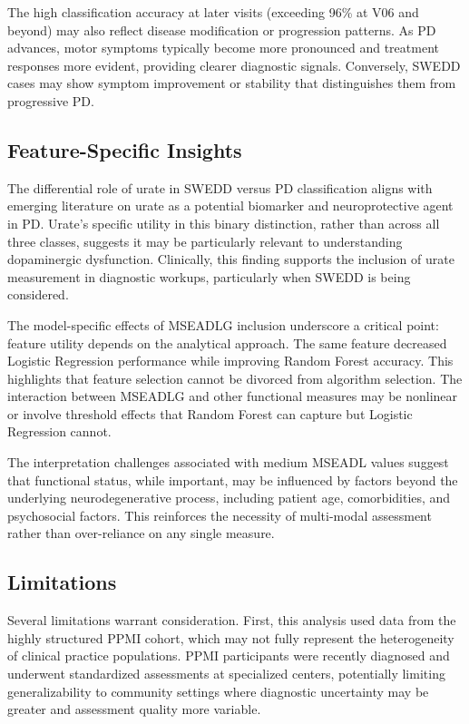\documentclass[12pt,a4paper]{article}
\begin{document}
The high classification accuracy at later visits (exceeding 96\% at V06 and beyond) may also reflect disease modification or progression patterns. As PD advances, motor symptoms typically become more pronounced and treatment responses more evident, providing clearer diagnostic signals. Conversely, SWEDD cases may show symptom improvement or stability that distinguishes them from progressive PD.

\subsection*{Feature-Specific Insights}

The differential role of urate in SWEDD versus PD classification aligns with emerging literature on urate as a potential biomarker and neuroprotective agent in PD. Urate's specific utility in this binary distinction, rather than across all three classes, suggests it may be particularly relevant to understanding dopaminergic dysfunction. Clinically, this finding supports the inclusion of urate measurement in diagnostic workups, particularly when SWEDD is being considered.

The model-specific effects of MSEADLG inclusion underscore a critical point: feature utility depends on the analytical approach. The same feature decreased Logistic Regression performance while improving Random Forest accuracy. This highlights that feature selection cannot be divorced from algorithm selection. The interaction between MSEADLG and other functional measures may be nonlinear or involve threshold effects that Random Forest can capture but Logistic Regression cannot.

The interpretation challenges associated with medium MSEADL values suggest that functional status, while important, may be influenced by factors beyond the underlying neurodegenerative process, including patient age, comorbidities, and psychosocial factors. This reinforces the necessity of multi-modal assessment rather than over-reliance on any single measure.

\subsection*{Limitations}

Several limitations warrant consideration. First, this analysis used data from the highly structured PPMI cohort, which may not fully represent the heterogeneity of clinical practice populations. PPMI participants were recently diagnosed and underwent standardized assessments at specialized centers, potentially limiting generalizability to community settings where diagnostic uncertainty may be greater and assessment quality more variable.
\end{document}
